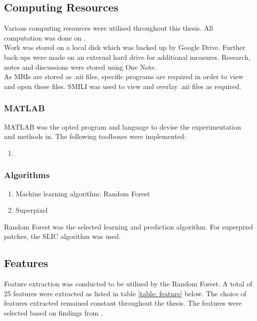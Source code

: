 \subsection{Computing Resources}
Various computing resources were utilised throughout this thesis. All computation was done on .
\\[1\baselineskip]
Work was stored on a local disk which was backed up by Google Drive. Further back-ups were made on an external hard drive for additional measures. Research, notes and discussions were stored using One Note.
\\[1\baselineskip]
As MRIs are stored as .nii files, specific programs are required in order to view and open these files. SMILI  was used to view and overlay .nii files as required. 
\subsubsection{MATLAB}
MATLAB was the opted program and language to devise the experimentation and methods in. The following toolboxes were implemented:
\begin{enumerate}
	\item {}
\end{enumerate} 
\subsubsection{Algorithms}
\begin{enumerate}
	\item  Machine learning algorithm: Random Forest
	\item  Superpixel 
\end{enumerate}
Random Forest was the selected learning and prediction algorithm. For superpixel patches, the SLIC algorithm was used. \

\subsection{Features}
Feature extraction was conducted to be utilised by the Random Forest. A total of 25 features were extracted as listed in table \ref{table: feature} below. The choice of features extracted remained constant throughout the thesis. The features were selected based on findings from . 

